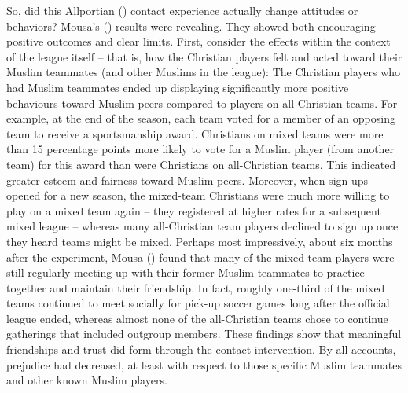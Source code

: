 \documentclass[
  letterpaper,
]{book}
\begin{document}
So, did this Allportian ()
contact experience actually change attitudes or behaviors? Mousa's
() results were revealing. They
showed both encouraging positive outcomes and clear limits. First,
consider the effects within the context of the league itself -- that is,
how the Christian players felt and acted toward their Muslim teammates
(and other Muslims in the league): The Christian players who had Muslim
teammates ended up displaying significantly more positive behaviours
toward Muslim peers compared to players on all-Christian teams. For
example, at the end of the season, each team voted for a member of an
opposing team to receive a sportsmanship award. Christians on mixed
teams were more than 15 percentage points more likely to vote for a
Muslim player (from another team) for this award than were Christians on
all-Christian teams. This indicated greater esteem and fairness toward
Muslim peers. Moreover, when sign-ups opened for a new season, the
mixed-team Christians were much more willing to play on a mixed team
again -- they registered at higher rates for a subsequent mixed league
-- whereas many all-Christian team players declined to sign up once they
heard teams might be mixed. Perhaps most impressively, about six months
after the experiment, Mousa ()
found that many of the mixed-team players were still regularly meeting
up with their former Muslim teammates to practice together and maintain
their friendship. In fact, roughly one-third of the mixed teams
continued to meet socially for pick-up soccer games long after the
official league ended, whereas almost none of the all-Christian teams
chose to continue gatherings that included outgroup members. These
findings show that meaningful friendships and trust did form through the
contact intervention. By all accounts, prejudice had decreased, at least
with respect to those specific Muslim teammates and other known Muslim
players.
\end{document}
